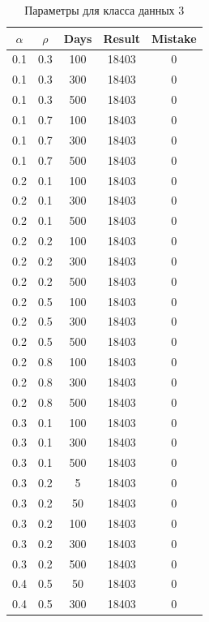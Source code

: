 \begin{center}
	\captionsetup{justification=raggedright,singlelinecheck=off}
	\begin{longtable}[c]{|c|c|c|c|c|}
		\caption{Параметры для класса данных 3\label{tbl:table_kd3}}\\ \hline
		$\alpha$ & $\rho$ & Days & Result & Mistake \\ \hline
		0.1 &  0.3 &  100 & 18403 &     0 \\
		0.1 &  0.3 &  300 & 18403 &     0 \\
		0.1 &  0.3 &  500 & 18403 &     0 \\ \hline
		0.1 &  0.7 &  100 & 18403 &     0 \\
		0.1 &  0.7 &  300 & 18403 &     0 \\
		0.1 &  0.7 &  500 & 18403 &     0 \\ \hline
		0.2 &  0.1 &  100 & 18403 &     0 \\
		0.2 &  0.1 &  300 & 18403 &     0 \\
		0.2 &  0.1 &  500 & 18403 &     0 \\ \hline
		0.2 &  0.2 &  100 & 18403 &     0 \\
		0.2 &  0.2 &  300 & 18403 &     0 \\
		0.2 &  0.2 &  500 & 18403 &     0 \\ \hline
		0.2 &  0.5 &  100 & 18403 &     0 \\
		0.2 &  0.5 &  300 & 18403 &     0 \\
		0.2 &  0.5 &  500 & 18403 &     0 \\ \hline
		0.2 &  0.8 &  100 & 18403 &     0 \\
		0.2 &  0.8 &  300 & 18403 &     0 \\
		0.2 &  0.8 &  500 & 18403 &     0 \\ \hline
		0.3 &  0.1 &  100 & 18403 &     0 \\
		0.3 &  0.1 &  300 & 18403 &     0 \\
		0.3 &  0.1 &  500 & 18403 &     0 \\ \hline
		0.3 &  0.2 &    5 & 18403 &     0 \\
		0.3 &  0.2 &   50 & 18403 &     0 \\
		0.3 &  0.2 &  100 & 18403 &     0 \\
		0.3 &  0.2 &  300 & 18403 &     0 \\
		0.3 &  0.2 &  500 & 18403 &     0 \\ \hline
		0.4 &  0.5 &   50 & 18403 &     0 \\
		0.4 &  0.5 &  300 & 18403 &     0 \\

\end{longtable}
\end{center}
